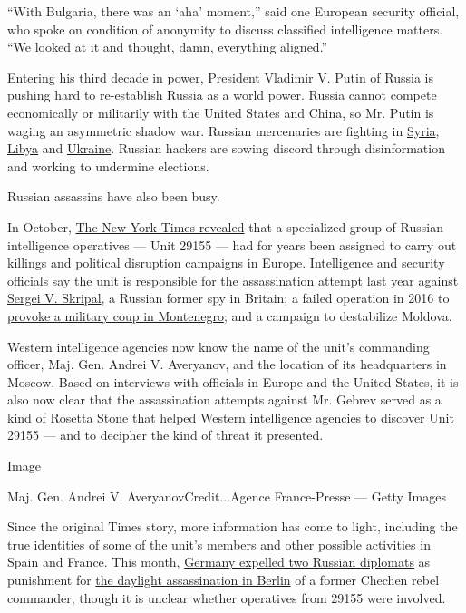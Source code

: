 ``With Bulgaria, there was an `aha' moment,'' said one European security
official, who spoke on condition of anonymity to discuss classified
intelligence matters. ``We looked at it and thought, damn, everything
aligned.''

Entering his third decade in power, President Vladimir V. Putin of
Russia is pushing hard to re-establish Russia as a world power. Russia
cannot compete economically or militarily with the United States and
China, so Mr. Putin is waging an asymmetric shadow war. Russian
mercenaries are fighting in
\href{https://www.nytimes.com/2018/05/24/world/middleeast/american-commandos-russian-mercenaries-syria.html}{Syria},
\href{https://www.nytimes.com/2019/11/05/world/middleeast/russia-libya-mercenaries.html}{Libya}
and
\href{https://www.nytimes.com/2014/05/28/world/europe/ukraine.html?searchResultPosition=2}{Ukraine}.
Russian hackers are sowing discord through disinformation and working to
undermine elections.

Russian assassins have also been busy.

In October,
\href{https://www.nytimes.com/2019/10/08/world/europe/unit-29155-russia-gru.html}{The
New York Times revealed} that a specialized group of Russian
intelligence operatives --- Unit 29155 --- had for years been assigned
to carry out killings and political disruption campaigns in Europe.
Intelligence and security officials say the unit is responsible for the
\href{https://www.nytimes.com/2018/03/05/world/europe/russian-spy-falls-ill-in-britain-again.html}{assassination
attempt last year against Sergei V. Skripal}, a Russian former spy in
Britain; a failed operation in 2016 to
\href{https://www.nytimes.com/2016/11/26/world/europe/finger-pointed-at-russians-in-alleged-coup-plot-in-montenegro.html}{provoke
a military coup in Montenegro}; and a campaign to destabilize Moldova.

Western intelligence agencies now know the name of the unit's commanding
officer, Maj. Gen. Andrei V. Averyanov, and the location of its
headquarters in Moscow. Based on interviews with officials in Europe and
the United States, it is also now clear that the assassination attempts
against Mr. Gebrev served as a kind of Rosetta Stone that helped Western
intelligence agencies to discover Unit 29155 --- and to decipher the
kind of threat it presented.

Image

Maj. Gen. Andrei V. AveryanovCredit...Agence France-Presse --- Getty
Images

Since the original Times story, more information has come to light,
including the true identities of some of the unit's members and other
possible activities in Spain and France. This month,
\href{https://www.nytimes.com/2019/12/04/world/europe/germany-assassination-russia.html}{Germany
expelled two Russian diplomats} as punishment for
\href{https://www.nytimes.com/2019/09/26/world/europe/berlin-murder-russia.html}{the
daylight assassination in Berlin} of a former Chechen rebel commander,
though it is unclear whether operatives from 29155 were involved.

